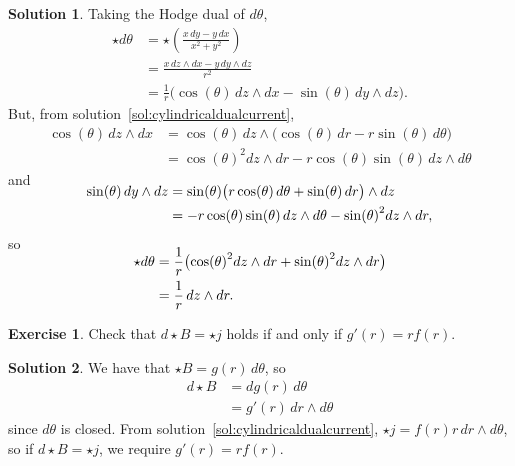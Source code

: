 \documentclass[11pt, a4paper]{report}
\theoremstyle{definition}
\newtheorem{ex}{Exercise}[part]
\newtheorem{sol}{Solution}[part]
\begin{document}
\begin{sol}

Taking the Hodge dual of $d\theta$,
\begin{align*}
    \star d\theta &= \star \left( \frac{x \, dy - y \, dx}{x^2 + y^2} \right) \\
                  &= \frac{x \,dz \wedge dx - y \, dy \wedge dz}{r^2} \\
                  &= \frac{1}{r} \bigl( \cos(\theta) \, dz \wedge dx - \sin(\theta) \, dy \wedge dz \bigr).
\end{align*}
But, from solution~\ref{sol:cylindricaldualcurrent},
\begin{align*}
    \cos(\theta) \, dz \wedge dx &= \cos(\theta) \, dz \wedge \bigl( \cos(\theta) \, dr -r \sin(\theta) \, d\theta \bigr) \\
        &= {\cos(\theta)}^2 dz \wedge dr - r \cos(\theta) \sin(\theta) \, dz \wedge d\theta
\end{align*}
and
\begin{align*}
    \SwapAboveDisplaySkip
    \sin(\theta) \, dy \wedge dz &= \sin(\theta) \bigl( r \cos(\theta) \, d\theta + \sin(\theta) \, dr \bigr) \wedge dz \\
        &= - r \cos(\theta) \sin(\theta) \, dz \wedge d\theta - {\sin(\theta)}^2 dz \wedge dr,
\end{align*}
so
\begin{align*}
    \SwapAboveDisplaySkip
    \star d\theta &= \frac{1}{r} \bigl( {\cos(\theta)}^2 dz \wedge dr + {\sin(\theta)}^2 dz \wedge dr \bigr) \\
                  &= \frac{1}{r} \, dz \wedge dr.
\end{align*}

\end{sol}

\begin{ex}

Check that $d \star B = \star j$ holds if and only if $g'(r) = r f(r)$.

\end{ex}

\begin{sol}

We have that $\star B = g(r) \, d\theta$, so
\begin{align*}
    d \star B &= dg(r) \, d\theta \\
              &= g'(r) \, dr \wedge d\theta
\end{align*}
since $d\theta$ is closed.
From solution~\ref{sol:cylindricaldualcurrent}, $\star j = f(r) r \, dr \wedge d\theta$, so if $d \star B = \star j$, we require $g'(r) = rf(r)$.

\end{sol}
\end{document}
